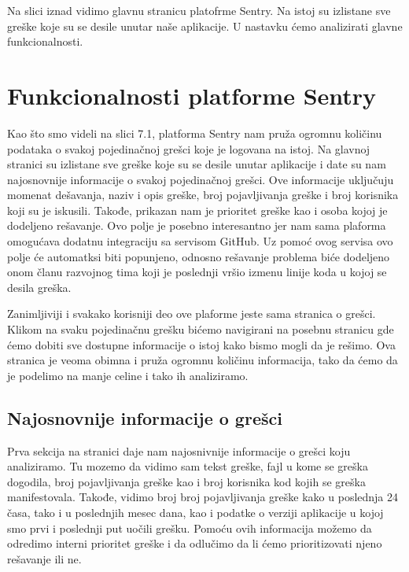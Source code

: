 \documentclass[12pt,oneside]{memoir}
\begin{document}
Na slici iznad vidimo glavnu stranicu platofrme Sentry. Na istoj su izlistane sve greške koje su se desile unutar naše aplikacije. U nastavku ćemo analizirati glavne funkcionalnosti.

\section{Funkcionalnosti platforme Sentry}

Kao što smo videli na slici 7.1, platforma Sentry nam pruža ogromnu količinu podataka o svakoj pojedinačnoj grešci koje je logovana na istoj. Na glavnoj stranici su izlistane sve greške koje su se desile unutar aplikacije i date su nam najosnovnije informacije o svakoj pojedinačnoj grešci. Ove informacije uključuju momenat dešavanja, naziv i opis greške, broj pojavljivanja greške i broj korisnika koji su je iskusili. Takođe, prikazan nam je prioritet greške kao i osoba kojoj je dodeljeno rešavanje. Ovo polje je posebno interesantno jer nam sama plaforma omogućava dodatnu integraciju sa servisom GitHub. Uz pomoć ovog servisa ovo polje će automatksi biti popunjeno, odnosno rešavanje problema biće dodeljeno onom članu razvojnog tima koji je poslednji vršio izmenu linije koda u kojoj se desila greška. \newline

Zanimljiviji i svakako korisniji deo ove plaforme jeste sama stranica o grešci. Klikom na svaku pojedinačnu grešku bićemo navigirani na posebnu stranicu gde ćemo dobiti sve dostupne informacije o istoj kako bismo mogli da je rešimo. Ova stranica je veoma obimna i pruža ogromnu količinu informacija, tako da ćemo da je podelimo na manje celine i tako ih analiziramo.

\subsection{Najosnovnije informacije o grešci}

Prva sekcija na stranici daje nam najosnivnije informacije o grešci koju analiziramo. Tu mozemo da vidimo sam tekst greške, fajl u kome se greška dogodila, broj pojavljivanja greške kao i broj korisnika kod kojih se greška manifestovala. Takođe, vidimo broj broj pojavljivanja greške kako u poslednja 24 časa, tako i u poslednjih mesec dana, kao i podatke o verziji aplikacije u kojoj smo prvi i poslednji put uočili grešku. Pomoću ovih informacija možemo da odredimo interni prioritet greške i da odlučimo da li ćemo prioritizovati njeno rešavanje ili ne.
\end{document}
